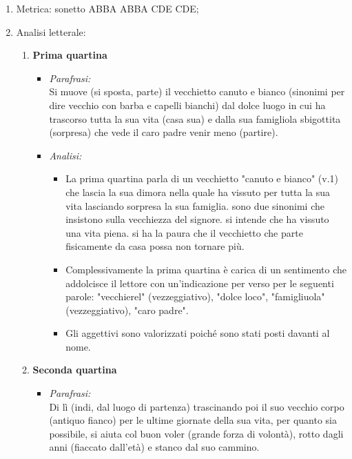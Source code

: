 \documentclass{article}
\begin{document}
\begin{enumerate}
    \item Metrica: sonetto ABBA ABBA CDE CDE;

    \item Analisi letterale:
        \begin{enumerate}[label=]
            \item \textbf{Prima quartina}
                \begin{itemize}[label=]
                    \item \textit{Parafrasi:}\\
                        Si muove (si sposta, parte) il vecchietto canuto e bianco (sinonimi per dire vecchio con barba e capelli bianchi) dal dolce luogo in cui ha trascorso tutta la sua vita (casa sua) e dalla sua famigliola sbigottita (sorpresa) che vede il caro padre venir meno (partire).
                    \item \textit{Analisi:}
                        \begin{itemize}
                            \item La prima quartina parla di un vecchietto "canuto e bianco" (v.1) che lascia la sua dimora nella quale ha vissuto per tutta la sua vita lasciando sorpresa la sua famiglia.
                             sono due sinonimi che insistono sulla vecchiezza del signore.
                             si intende che ha vissuto una vita piena.
                             si ha la paura che il vecchietto che parte fisicamente da casa possa non tornare più.
                            \item Complessivamente la prima quartina è carica di un sentimento che addolcisce il lettore con un'indicazione per verso per le seguenti parole: "vecchierel" (vezzeggiativo), "dolce loco", "famigliuola" (vezzeggiativo), "caro padre".
                            \item Gli aggettivi sono valorizzati poiché sono stati posti davanti al nome.
                        \end{itemize}
                \end{itemize}
            \item \textbf{Seconda quartina}
                \begin{itemize}[label=]
                    \item \textit{Parafrasi:}\\
                        Di lì (indi, dal luogo di partenza) trascinando poi il suo vecchio corpo (antiquo fianco) per le ultime giornate della sua vita, per quanto sia possibile, si aiuta col buon voler (grande forza di volontà), rotto dagli anni (fiaccato dall'età) e stanco dal suo cammino.

\end{itemize}
\end{enumerate}
\end{enumerate}
\end{document}
